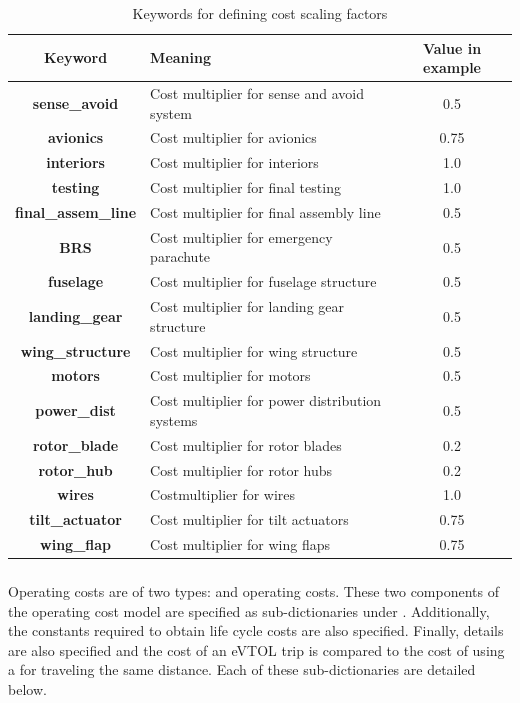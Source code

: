\begin{table}[H]
\begin{center}
	\caption{Keywords for defining cost scaling factors}
	\label{tbl:cost_tech_factors}
    \begin{tabular}{| c | l | c |}
    \hline
    Keyword & Meaning & Value in example \\ 
    \hline
\textbf{sense\_avoid} & Cost multiplier for sense and avoid system & 0.5 \\
\textbf{avionics} & Cost multiplier for avionics &  0.75 \\
\textbf{interiors} & Cost multiplier for interiors &  1.0 \\
\textbf{testing} & Cost multiplier for final testing &  1.0 \\
\textbf{final\_assem\_line} & Cost multiplier for final assembly line &  0.5 \\
\textbf{BRS} & Cost multiplier for emergency parachute &  0.5 \\
\textbf{fuselage} & Cost multiplier for fuselage structure &  0.5 \\
\textbf{landing\_gear} & Cost multiplier for landing gear structure &  0.5 \\
\textbf{wing\_structure} & Cost multiplier for wing structure&  0.5 \\
\textbf{motors} & Cost multiplier for motors & 0.5 \\
\textbf{power\_dist} & Cost multiplier for power distribution systems &  0.5 \\
\textbf{rotor\_blade} & Cost multiplier for rotor blades &  0.2 \\
\textbf{rotor\_hub} & Cost multiplier for rotor hubs&  0.2 \\
\textbf{wires} & Costmultiplier for wires &  1.0 \\
\textbf{tilt\_actuator} & Cost multiplier for tilt actuators &  0.75 \\
\textbf{wing\_flap} & Cost multiplier for wing flaps &  0.75 \\
     \hline
  \end{tabular}
\end{center}
\end{table}

\subsubsection{}
Operating costs are of two types:  and  operating costs. These two components of the operating cost model are specified as sub-dictionaries under . Additionally, the constants required to obtain  life cycle costs are also specified. Finally,  details are also specified and the cost of an eVTOL trip is compared to the cost of using a  for traveling the same distance. Each of these sub-dictionaries are detailed below.

